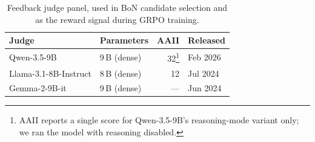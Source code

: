 \begin{table}[h]
  \centering\footnotesize
  \caption{Feedback judge panel, used in BoN candidate selection and as the reward signal during GRPO training.}
  \label{tab:feedback-judges}
  \begin{tabular}{llrl}
    \toprule
    Judge & Parameters & AAII & Released \\
    \midrule
    Qwen-3.5-9B \citep{qwenQwen359BCard}                    & 9\,B (dense) & 32\footnote{AAII reports a single score for Qwen-3.5-9B's reasoning-mode variant only; we ran the model with reasoning disabled.} \citep{aaQwen359B} & Feb 2026 \\
    Llama-3.1-8B-Instruct \citep{metaLlama318BInstructCard} & 8\,B (dense) & 12 \citep{aaLlama318B}                      & Jul 2024 \\
    Gemma-2-9B-it \citep{googleGemma29BItCard}              & 9\,B (dense) & ---                                         & Jun 2024 \\
    \bottomrule
  \end{tabular}
\end{table}
